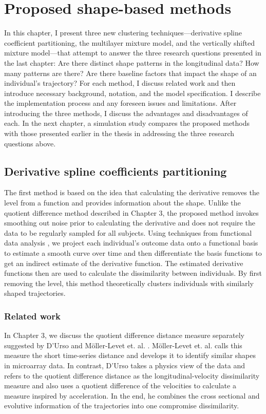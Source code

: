 \chapter{Proposed shape-based methods}
In this chapter, I present three new clustering techniques---derivative spline coefficient partitioning, the multilayer mixture model, and the vertically shifted mixture model---that attempt to answer the three research questions presented in the last chapter: Are there distinct shape patterns in the longitudinal data? How many patterns are there? Are there baseline factors that impact the shape of an individual's trajectory? For each method, I discuss related work and then introduce necessary background, notation, and the model specification. I describe the implementation process and any foreseen issues and limitations. After introducing the three methods, I discuss the advantages and disadvantages of each. In the next chapter, a simulation study compares the proposed methods with those presented earlier in the thesis in addressing the three research questions above.

\section{Derivative spline coefficients partitioning}
The first method is based on the idea that calculating the derivative removes the level from a function and provides information about the shape. Unlike the quotient difference method described in Chapter 3,  the proposed method invokes smoothing out noise prior to calculating the derivative and does not require the data to be regularly sampled for all subjects. Using techniques from functional data analysis \cite{ramsay2002}, we project each individual's outcome data onto a functional basis to estimate a smooth curve over time and then differentiate the basis functions to get an indirect estimate of the derivative function. The estimated derivative functions then are used to calculate the dissimilarity between individuals. By first removing the level, this  method theoretically clusters individuals with similarly shaped trajectories.

\subsection{Related work}
In Chapter 3, we discuss the quotient difference distance measure separately suggested by D'Urso and M{\"o}ller-Levet et. al. \cite{d2000,moller2003}. M{\"o}ller-Levet et. al. calls this measure the short time-series distance and develops it to identify similar shapes in microarray data. In contrast, D'Urso takes a physics view of the data and refers to the quotient difference distance as the longitudinal-velocity dissimilarity measure and also uses a quotient difference of the velocities to calculate a measure inspired by acceleration. In the end, he combines the cross sectional and evolutive information of the trajectories into one compromise dissimilarity.

